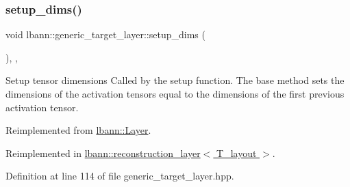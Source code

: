 \subsubsection{\texorpdfstring{setup\+\_\+dims()}{setup\_dims()}}
{\footnotesize\ttfamily void lbann\+::generic\+\_\+target\+\_\+layer\+::setup\+\_\+dims (\begin{DoxyParamCaption}{ }\end{DoxyParamCaption})\hspace{0.3cm}{\ttfamily [inline]}, {\ttfamily [override]}, {\ttfamily [virtual]}}

Setup tensor dimensions Called by the setup function. The base method sets the dimensions of the activation tensors equal to the dimensions of the first previous activation tensor. 

Reimplemented from \hyperlink{classlbann_1_1Layer_a90fce1b06c1f2abb480e18cfe08a9746}{lbann\+::\+Layer}.



Reimplemented in \hyperlink{classlbann_1_1reconstruction__layer_a3abb27b670b5c57f2a6b1d669a7de508}{lbann\+::reconstruction\+\_\+layer$<$ T\+\_\+layout $>$}.



Definition at line 114 of file generic\+\_\+target\+\_\+layer.\+hpp.


